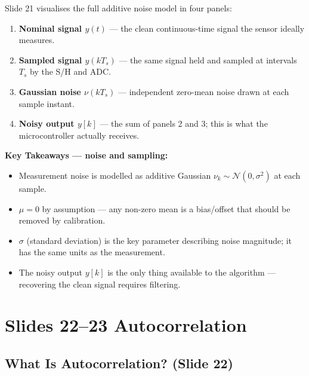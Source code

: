 \documentclass[12pt, a4paper]{article}
\begin{document}
Slide 21 visualises the full additive noise model in four panels:

\begin{enumerate}[leftmargin=1.5em]
  \item \textbf{Nominal signal $y(t)$} --- the clean continuous-time signal
        the sensor ideally measures.
  \item \textbf{Sampled signal $y(kT_s)$} --- the same signal held and
        sampled at intervals $T_s$ by the S/H and ADC.
  \item \textbf{Gaussian noise $\nu(kT_s)$} --- independent zero-mean
        noise drawn at each sample instant.
  \item \textbf{Noisy output $y[k]$} --- the sum of panels 2 and 3; this
        is what the microcontroller actually receives.
\end{enumerate}

\begin{keybox}
  \textbf{Key Takeaways --- noise and sampling:}
  \begin{itemize}[leftmargin=1.5em, topsep=2pt]
    \item Measurement noise is modelled as additive Gaussian
          $\nu_k \sim \mathcal{N}(0, \sigma^2)$ at each sample.
    \item $\mu = 0$ by assumption --- any non-zero mean is a bias/offset
          that should be removed by calibration.
    \item $\sigma$ (standard deviation) is the key parameter describing
          noise magnitude; it has the same units as the measurement.
    \item The noisy output $y[k]$ is the only thing available to the
          algorithm --- recovering the clean signal requires filtering.
  \end{itemize}
\end{keybox}

\section*{Slides 22--23 \quad Autocorrelation}

\subsection*{What Is Autocorrelation? (Slide 22)}
\end{document}

